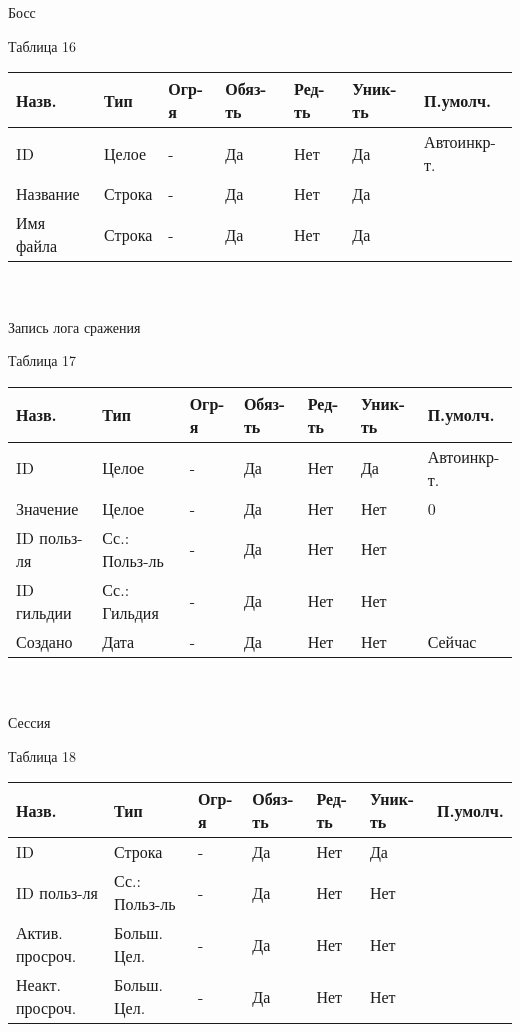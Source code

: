 \documentclass[../document.tex]{subfiles}
\begin{document}
\\\\
Босс
\begin{flushright}
  Таблица 16
\end{flushright}
\begin{tabular}{ | l | l | l | l | l | l | l | }
  \hline
  Назв.     & Тип    & Огр-я & Обяз-ть & Ред-ть & Уник-ть & П.умолч.    \\
  \hline
  ID        & Целое  & -     & Да      & Нет    & Да      & Автоинкр-т. \\
  Название  & Строка & -     & Да      & Нет    & Да      &             \\
  Имя файла & Строка & -     & Да      & Нет    & Да      &             \\
  \hline
\end{tabular}
\\\\
Запись лога сражения
\begin{flushright}
  Таблица 17
\end{flushright}
\begin{tabular}{ | l | l | l | l | l | l | l | }
  \hline
  Назв.       & Тип           & Огр-я & Обяз-ть & Ред-ть & Уник-ть & П.умолч.    \\
  \hline
  ID          & Целое         & -     & Да      & Нет    & Да      & Автоинкр-т. \\
  Значение    & Целое         & -     & Да      & Нет    & Нет     & 0           \\
  ID польз-ля & Сс.: Польз-ль & -     & Да      & Нет    & Нет     &             \\
  ID гильдии  & Сс.: Гильдия  & -     & Да      & Нет    & Нет     &             \\
  Создано     & Дата          & -     & Да      & Нет    & Нет     & Сейчас      \\
  \hline
\end{tabular}
\\\\
Сессия
\begin{flushright}
  Таблица 18
\end{flushright}
\begin{tabular}{ | l | l | l | l | l | l | l | }
  \hline
  Назв.           & Тип           & Огр-я & Обяз-ть & Ред-ть & Уник-ть & П.умолч. \\
  \hline
  ID              & Строка        & -     & Да      & Нет    & Да      &          \\
  ID польз-ля     & Сс.: Польз-ль & -     & Да      & Нет    & Нет     &          \\
  Актив. просроч. & Больш. Цел.   & -     & Да      & Нет    & Нет     &          \\
  Неакт. просроч. & Больш. Цел.   & -     & Да      & Нет    & Нет     &          \\
  \hline
\end{tabular}
\end{document}
